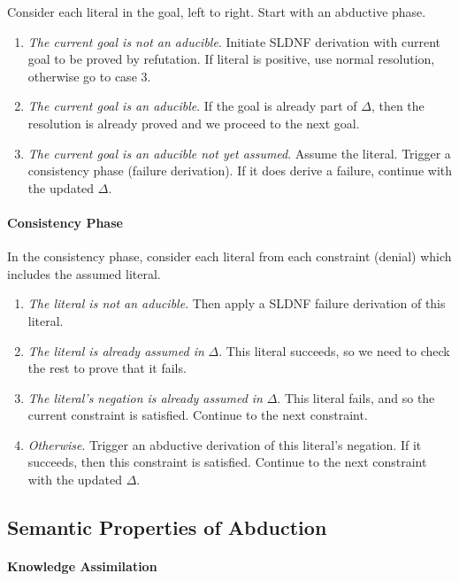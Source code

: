 \documentclass[twocolumn,english]{article}
\begin{document}
Consider each literal in the goal, left to right. Start with an abductive
phase.
\begin{enumerate}
\item \emph{The current goal is not an aducible}. Initiate SLDNF derivation
with current goal to be proved by refutation. If literal is positive,
use normal resolution, otherwise go to case 3.
\item \emph{The current goal is an aducible}. If the goal is already part
of $\Delta$, then the resolution is already proved and we proceed
to the next goal.
\item \emph{The current goal is an aducible not yet assumed}. Assume the
literal. Trigger a consistency phase (failure derivation). If it does
derive a failure, continue with the updated $\Delta$.
\end{enumerate}

\paragraph{Consistency Phase}

In the consistency phase, consider each literal from each constraint
(denial) which includes the assumed literal.
\begin{enumerate}
\item \emph{The literal is not an aducible}. Then apply a SLDNF failure
derivation of this literal.
\item \emph{The literal is already assumed in} $\Delta$. This literal succeeds,
so we need to check the rest to prove that it fails.
\item \emph{The literal's negation is already assumed in} $\Delta$. This
literal fails, and so the current constraint is satisfied. Continue
to the next constraint.
\item \emph{Otherwise}. Trigger an abductive derivation of this literal's
negation. If it succeeds, then this constraint is satisfied. Continue
to the next constraint with the updated $\Delta$.
\end{enumerate}

\subsection{Semantic Properties of Abduction}

\paragraph{Knowledge Assimilation}
\end{document}
